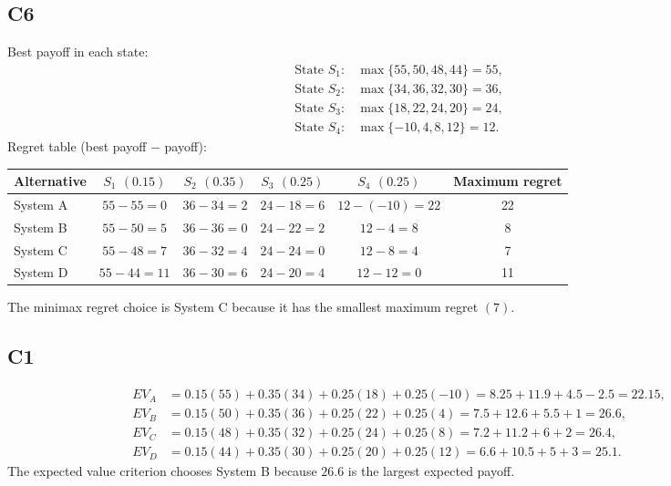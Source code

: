 \begin{ExamProblems}
		\subsection*{C6}
		Best payoff in each state:
		\[
		\begin{aligned}
			\text{State } S_1: &\max\{55, 50, 48, 44\} = 55, \\
			\text{State } S_2: &\max\{34, 36, 32, 30\} = 36, \\
			\text{State } S_3: &\max\{18, 22, 24, 20\} = 24, \\
			\text{State } S_4: &\max\{-10, 4, 8, 12\} = 12.
		\end{aligned}
		\]
		Regret table (best payoff $-$ payoff):
		\begin{center}
			\begin{tabular}{l c c c c c}
				\toprule
				Alternative & $S_1$ $(0.15)$ & $S_2$ $(0.35)$ & $S_3$ $(0.25)$ & $S_4$ $(0.25)$ & Maximum regret \\
				\midrule
				System A & $55-55=0$ & $36-34=2$ & $24-18=6$ & $12-(-10)=22$ & 22 \\
				System B & $55-50=5$ & $36-36=0$ & $24-22=2$ & $12-4=8$ & 8 \\
				System C & $55-48=7$ & $36-32=4$ & $24-24=0$ & $12-8=4$ & 7 \\
				System D & $55-44=11$ & $36-30=6$ & $24-20=4$ & $12-12=0$ & 11 \\
				\bottomrule
			\end{tabular}
		\end{center}
		The minimax regret choice is System C because it has the smallest maximum regret $(7)$.
		
		\subsection*{C1}
		\[
		\begin{aligned}
		EV_A &= 0.15(55)+0.35(34)+0.25(18)+0.25(-10)=8.25+11.9+4.5-2.5=22.15,\\
		EV_B &= 0.15(50)+0.35(36)+0.25(22)+0.25(4)=7.5+12.6+5.5+1=26.6,\\
		EV_C &= 0.15(48)+0.35(32)+0.25(24)+0.25(8)=7.2+11.2+6+2=26.4,\\
		EV_D &= 0.15(44)+0.35(30)+0.25(20)+0.25(12)=6.6+10.5+5+3=25.1.
		\end{aligned}
		\]
		The expected value criterion chooses System B because $26.6$ is the largest expected payoff.
		
		\item

\end{ExamProblems}

